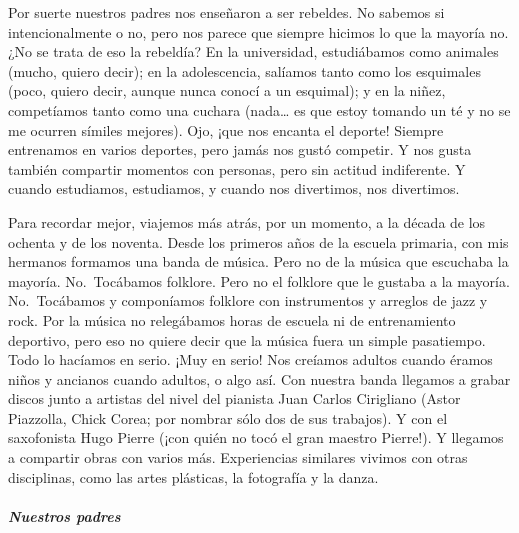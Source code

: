 \documentclass[
]{article}
\begin{document}
Por suerte nuestros padres nos enseñaron a ser rebeldes. No sabemos si
intencionalmente o no, pero nos parece que siempre hicimos lo que la
mayoría no. ¿No se trata de eso la rebeldía? En la universidad,
estudiábamos como animales (mucho, quiero decir); en la adolescencia,
salíamos tanto como los esquimales (poco, quiero decir, aunque nunca
conocí a un esquimal); y en la niñez, competíamos tanto como una cuchara
(nada\ldots{} es que estoy tomando un té y no se me ocurren símiles
mejores). Ojo, ¡que nos encanta el deporte! Siempre entrenamos en varios
deportes, pero jamás nos gustó competir. Y nos gusta también compartir
momentos con personas, pero sin actitud indiferente. Y cuando
estudiamos, estudiamos, y cuando nos divertimos, nos divertimos.

Para recordar mejor, viajemos más atrás, por un momento, a la década de
los ochenta y de los noventa. Desde los primeros años de la escuela
primaria, con mis hermanos formamos una banda de música. Pero no de la
música que escuchaba la mayoría. No.~Tocábamos folklore. Pero no el
folklore que le gustaba a la mayoría. No.~Tocábamos y componíamos
folklore con instrumentos y arreglos de jazz y rock. Por la música no
relegábamos horas de escuela ni de entrenamiento deportivo, pero eso no
quiere decir que la música fuera un simple pasatiempo. Todo lo hacíamos
en serio. ¡Muy en serio! Nos creíamos adultos cuando éramos niños y
ancianos cuando adultos, o algo así. Con nuestra banda llegamos a grabar
discos junto a artistas del nivel del pianista Juan Carlos Cirigliano
(Astor Piazzolla, Chick Corea; por nombrar sólo dos de sus trabajos). Y
con el saxofonista Hugo Pierre (¡con quién no tocó el gran maestro
Pierre!). Y llegamos a compartir obras con varios más. Experiencias
similares vivimos con otras disciplinas, como las artes plásticas, la
fotografía y la danza.

\hypertarget{nuestros-padres}{%
\subparagraph{Nuestros padres}\label{nuestros-padres}}
\end{document}
